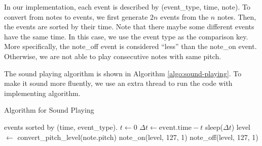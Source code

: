 In our implementation, each event is described by (event\_type, time, note). To convert from notes to events, we first
generate $2n$ events from the $n$ notes. Then, the events are sorted by their time. Note that there maybe some different
events have the same time. In this case, we use the event type as the comparison key. More specifically, the note\_off event is considered ``less'' than the note\_on event. Otherwise, we are not able to play consecutive notes with same pitch.

The sound playing algorithm is shown in Algorithm \ref{algo:sound-playing}. To make it sound more fluently, we use an extra thread to run the code with implementing algorithm.

\begin{algorithm}
    \caption{Algorithm for Sound Playing} \label{algo:sound-playing}
    \begin{algorithmic}
            \Require events sorted by (time, event\_type).
            \State $ t \gets 0$ 
                \State $ \Delta t \gets \mathrm{event.time} - t$
                \State sleep($\Delta t$)
                \State level $\gets$ convert\_pitch\_level(note.pitch)
                    \State note\_on(level, 127, 1)
                \Else
                    \State note\_off(level, 127, 1)
                \EndIf
            \EndFor
        \EndProcedure
    \end{algorithmic}
\end{algorithm}

